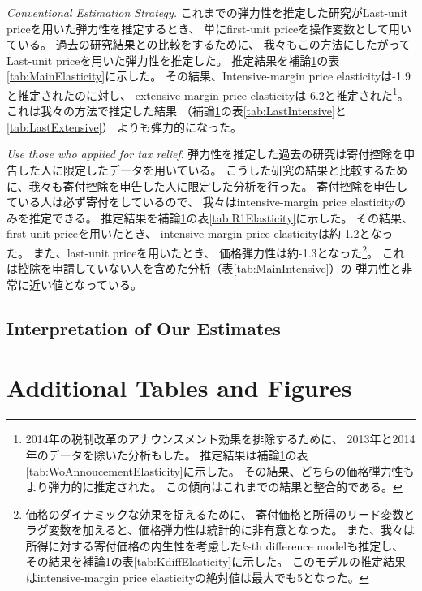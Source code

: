 \documentclass[
  11pt,
  a4paper,
]{article}
\begin{document}
\noindent
\emph{Conventional Estimation Strategy.}
これまでの弾力性を推定した研究がLast-unit priceを用いた弾力性を推定するとき、
単にfirst-unit priceを操作変数として用いている。
過去の研究結果との比較をするために、
我々もこの方法にしたがってLast-unit priceを用いた弾力性を推定した。
推定結果を補論\ref{addtab}の表\ref{tab:MainElasticity}に示した。
その結果、Intensive-margin price elasticityは-1.9と推定されたのに対し、
extensive-margin price elasticityは-6.2と推定された\footnote{2014年の税制改革のアナウンスメント効果を排除するために、
  2013年と2014年のデータを除いた分析もした。
  推定結果は補論\ref{addtab}の表\ref{tab:WoAnnoucementElasticity}に示した。
  その結果、どちらの価格弾力性もより弾力的に推定された。
  この傾向はこれまでの結果と整合的である。}。
これは我々の方法で推定した結果
（補論\ref{addtab}の表\ref{tab:LastIntensive}と\ref{tab:LastExtensive}）
よりも弾力的になった。

\noindent
\emph{Use those who applied for tax relief}.
弾力性を推定した過去の研究は寄付控除を申告した人に限定したデータを用いている。
こうした研究の結果と比較するために、我々も寄付控除を申告した人に限定した分析を行った。
寄付控除を申告している人は必ず寄付をしているので、
我々はintensive-margin price elasticityのみを推定できる。
推定結果を補論\ref{addtab}の表\ref{tab:R1Elasticity}に示した。
その結果、first-unit priceを用いたとき、
intensive-margin price elasticityは約-1.2となった。
また、last-unit priceを用いたとき、
価格弾力性は約-1.3となった\footnote{価格のダイナミックな効果を捉えるために、
  寄付価格と所得のリード変数とラグ変数を加えると、価格弾力性は統計的に非有意となった。
  また、我々は所得に対する寄付価格の内生性を考慮した\(k\)-th difference modelも推定し、
  その結果を補論\ref{addtab}の表\ref{tab:KdiffElasticity}に示した。
  このモデルの推定結果はintensive-margin price elasticityの絶対値は最大でも5となった。}。
これは控除を申請していない人を含めた分析（表\ref{tab:MainIntensive}）の
弾力性と非常に近い値となっている。

\hypertarget{interpretation-of-our-estimates}{%
\subsection{Interpretation of Our Estimates}\label{interpretation-of-our-estimates}}

\newpage

\hypertarget{appendix-appendix}{%
\appendix}


\hypertarget{addtab}{%
\section{Additional Tables and Figures}\label{addtab}}
\end{document}
